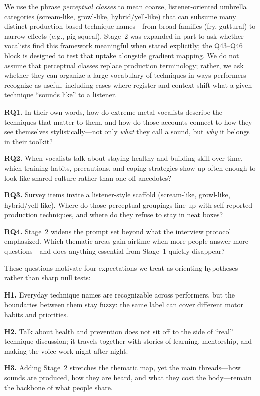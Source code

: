 \documentclass{article}
\begin{document}
We use the phrase \emph{perceptual classes} to mean coarse, listener-oriented umbrella categories (scream-like, growl-like, hybrid/yell-like) that can subsume many distinct production-based technique names---from broad families (fry, guttural) to narrow effects (e.g., pig squeal).
Stage~2 was expanded in part to ask whether vocalists find this framework meaningful when stated explicitly; the Q43--Q46 block is designed to test that uptake alongside gradient mapping.
We do not assume that perceptual classes replace production terminology; rather, we ask whether they can organize a large vocabulary of techniques in ways performers recognize as useful, including cases where register and context shift what a given technique ``sounds like'' to a listener.

\textbf{RQ1.} In their own words, how do extreme metal vocalists describe the techniques that matter to them, and how do those accounts connect to how they see themselves stylistically---not only \emph{what} they call a sound, but \emph{why} it belongs in their toolkit?

\textbf{RQ2.} When vocalists talk about staying healthy and building skill over time, which training habits, precautions, and coping strategies show up often enough to look like shared culture rather than one-off anecdotes?

\textbf{RQ3.} Survey items invite a listener-style scaffold (scream-like, growl-like, hybrid/yell-like). Where do those perceptual groupings line up with self-reported production techniques, and where do they refuse to stay in neat boxes?

\textbf{RQ4.} Stage~2 widens the prompt set beyond what the interview protocol emphasized. Which thematic areas gain airtime when more people answer more questions---and does anything essential from Stage~1 quietly disappear?

\medskip
\noindent
These questions motivate four expectations we treat as orienting hypotheses rather than sharp null tests:

\textbf{H1.} Everyday technique names are recognizable across performers, but the boundaries between them stay fuzzy: the same label can cover different motor habits and priorities.

\textbf{H2.} Talk about health and prevention does not sit off to the side of ``real'' technique discussion; it travels together with stories of learning, mentorship, and making the voice work night after night.

\textbf{H3.} Adding Stage~2 stretches the thematic map, yet the main threads---how sounds are produced, how they are heard, and what they cost the body---remain the backbone of what people share.
\end{document}
